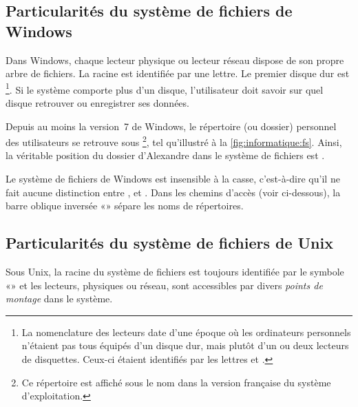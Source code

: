 \subsection{Particularités du système de fichiers de Windows}
\label{sec:informatique:fs:windows}

Dans Windows, chaque lecteur physique ou lecteur réseau
dispose de son propre arbre de fichiers. La racine est identifiée par
une lettre. Le premier disque dur est \footnote{%
  La nomenclature des lecteurs date d'une époque où les ordinateurs
  personnels n'étaient pas tous équipés d'un disque dur, mais plutôt
  d'un ou deux lecteurs de disquettes. Ceux-ci étaient identifiés par
  les lettres  et .}. %
Si le système comporte plus d'un disque, l'utilisateur doit savoir sur
quel disque retrouver ou enregistrer ses données.

Depuis au moins la version~7 de Windows, le répertoire
(ou dossier) personnel des utilisateurs se retrouve sous
\footnote{%
  Ce répertoire est affiché sous le nom  dans la
  version française du système d'exploitation.}, %
tel qu'illustré à la \autoref{fig:informatique:fs}. Ainsi, la
véritable position du dossier  d'Alexandre dans le
système de fichiers est
.

Le système de fichiers de Windows est insensible à la
casse, c'est-à-dire qu'il ne fait aucune distinction entre
,  et .
Dans les chemins d'accès (voir ci-dessous), la barre oblique inversée
«{\bs}» sépare les noms de répertoires.


\subsection{Particularités du système de fichiers de Unix}
\label{sec:informatique:fs:unix}

Sous Unix, la racine du système de fichiers est toujours
identifiée par le symbole «\code{/}» et les lecteurs, physiques ou
réseau, sont accessibles par divers \emph{points de montage} dans le
système.

